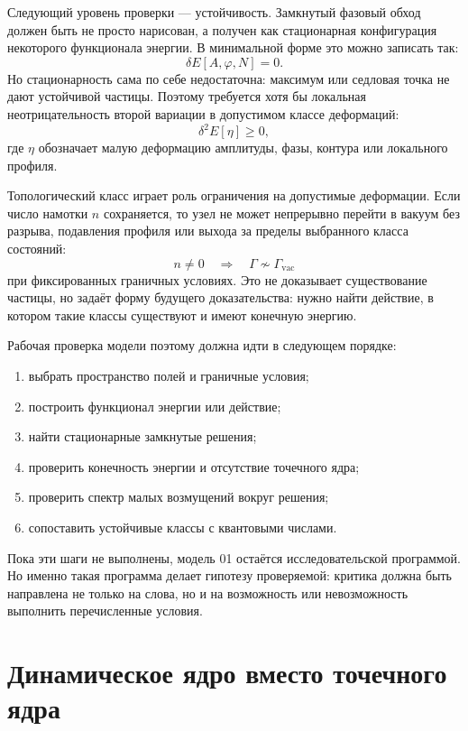\documentclass[11pt,a4paper]{article}
\newcommand{\phase}{\varphi}
\begin{document}
Следующий уровень проверки --- устойчивость. Замкнутый фазовый обход должен быть не просто нарисован, а получен как стационарная конфигурация некоторого функционала энергии. В минимальной форме это можно записать так:
\begin{equation}
\delta E[A,\phase,N]=0.
\end{equation}
Но стационарность сама по себе недостаточна: максимум или седловая точка не дают устойчивой частицы. Поэтому требуется хотя бы локальная неотрицательность второй вариации в допустимом классе деформаций:
\begin{equation}
\delta^2E[\eta]\geq 0,
\end{equation}
где $\eta$ обозначает малую деформацию амплитуды, фазы, контура или локального профиля.

Топологический класс играет роль ограничения на допустимые деформации. Если число намотки $n$ сохраняется, то узел не может непрерывно перейти в вакуум без разрыва, подавления профиля или выхода за пределы выбранного класса состояний:
\begin{equation}
n \neq 0 \quad \Rightarrow \quad \Gamma \not\sim \Gamma_{\mathrm{vac}}
\end{equation}
при фиксированных граничных условиях. Это не доказывает существование частицы, но задаёт форму будущего доказательства: нужно найти действие, в котором такие классы существуют и имеют конечную энергию.

Рабочая проверка модели поэтому должна идти в следующем порядке:
\begin{enumerate}
\item выбрать пространство полей и граничные условия;
\item построить функционал энергии или действие;
\item найти стационарные замкнутые решения;
\item проверить конечность энергии и отсутствие точечного ядра;
\item проверить спектр малых возмущений вокруг решения;
\item сопоставить устойчивые классы с квантовыми числами.
\end{enumerate}

Пока эти шаги не выполнены, модель 01 остаётся исследовательской программой. Но именно такая программа делает гипотезу проверяемой: критика должна быть направлена не только на слова, но и на возможность или невозможность выполнить перечисленные условия.

\section{Динамическое ядро вместо точечного ядра}
\end{document}
